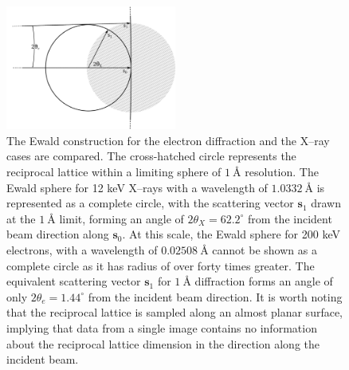 \documentclass[preprint]{iucr}
\renewcommand{\vec}[1]{\mathbf{#1}}
\begin{document}
\begin{figure}
  \label{fig:ewald}
  \centering
  \caption{
    The Ewald construction for the electron diffraction and the X--ray cases are
    compared. The cross-hatched circle represents the reciprocal lattice within
    a limiting sphere of $\SI{1}{\angstrom}$ resolution. The Ewald
    sphere for 12 keV X--rays with a wavelength of $\SI{1.0332}{\angstrom}$ is
    represented as a complete circle, with the scattering vector $\vec{s}_1$
    drawn at the $\SI{1}{\angstrom}$ limit, forming an angle of
    $2\theta_X=62.2^\circ$ from the incident beam direction along $\vec{s}_0$.
    At this scale, the Ewald sphere for 200 keV electrons, with a wavelength of
    $\SI{0.02508}{\angstrom}$ cannot be shown as a complete circle as it has
    radius of over forty times greater. The equivalent scattering vector
    $\vec{s}_1$ for $\SI{1}{\angstrom}$ diffraction forms an angle of only
    $2\theta_e=1.44^\circ$ from the incident beam direction. It is worth noting
    that the reciprocal lattice is sampled along an almost planar surface,
    implying that data from a single image contains no information about the
    reciprocal lattice dimension in the direction along the incident beam.
  }
  \includegraphics[width=0.5\textwidth]{Figures/geometry/ewald.png}
\end{figure}
\end{document}
